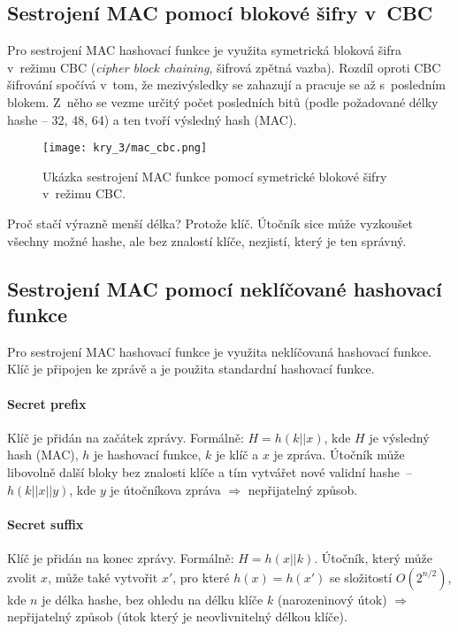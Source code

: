 \subsection*{Sestrojení MAC pomocí blokové šifry v~CBC}

Pro sestrojení MAC hashovací funkce je využita symetrická bloková šifra v~režimu CBC (\textit{cipher block chaining}, šifrová zpětná vazba). Rozdíl oproti CBC šifrování spočívá v~tom, že mezivýsledky se zahazují a pracuje se až s~posledním blokem. Z~něho se vezme určitý počet posledních bitů (podle požadované délky hashe -- 32, 48, 64) a ten tvoří výsledný hash (MAC).

\begin{figure}[H]
    \centering
    \texttt{[image: kry\_3/mac\_cbc.png]}
    \caption{Ukázka sestrojení MAC funkce pomocí symetrické blokové šifry v~režimu CBC.}
\end{figure}

Proč stačí výrazně menší délka? Protože klíč. Útočník sice může vyzkoušet všechny možné hashe, ale bez znalostí klíče, nezjistí, který je ten správný.

\subsection*{Sestrojení MAC pomocí neklíčované hashovací funkce}

Pro sestrojení MAC hashovací funkce je využita neklíčovaná hashovací funkce. Klíč je připojen ke zprávě a je použita standardní hashovací funkce.

\paragraph*{Secret prefix} Klíč je přidán na začátek zprávy. Formálně: $H = h(k || x)$, kde $H$ je výsledný hash (MAC), $h$ je hashovací funkce, $k$ je klíč a $x$ je zpráva. Útočník může libovolně  další bloky bez znalosti klíče a tím vytvářet nové validní hashe~--~$h(k || x || y)$, kde $y$ je útočníkova zpráva $\Rightarrow$ nepřijatelný způsob.

\paragraph*{Secret suffix} Klíč je přidán na konec zprávy. Formálně: $H = h(x || k)$. Útočník, který může zvolit $x$, může také vytvořit $x'$, pro které $h(x) = h(x')$ se složitostí $O(2^{n/2})$, kde $n$ je délka hashe, bez ohledu na délku klíče $k$ (narozeninový útok) $\Rightarrow$ nepřijatelný způsob (útok který je neovlivnitelný délkou klíče).

